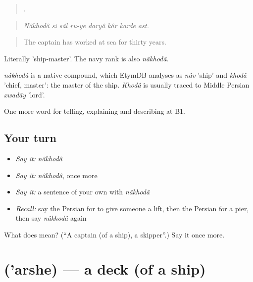 \begin{quote}
       .
\end{quote}

\begin{quote}
\emph{Nâkhodâ si sâl ru-ye daryâ kâr karde ast.}
\end{quote}

\begin{quote}
The captain has worked at sea for thirty years.
\end{quote}

Literally 'ship-master'. The navy rank is also \emph{nâkhodâ}.

\begin{cousinweb}
\emph{nâkhodâ} is a native compound, which EtymDB analyses as \emph{nâv} 'ship' and \emph{khodâ} 'chief, master': the master of the ship. \emph{Khodâ} is usually traced to Middle Persian \emph{xwadāy} 'lord'.
\end{cousinweb}

\begin{grammarlens}[title={What you've built}]
One more word for telling, explaining and describing at B1.
\end{grammarlens}

\subsection*{Your turn}
\begin{itemize}
\raggedright
  \item \emph{Say it:} \emph{nâkhodâ}
  \item \emph{Say it:} \emph{nâkhodâ}, once more
  \item \emph{Say it:} a sentence of your own with \emph{nâkhodâ}
  \item \emph{Recall:} say the Persian for to give someone a lift, then the Persian for a pier, then say \emph{nâkhodâ} again
\end{itemize}

\begin{tcolorbox}[breakable,colback=teal!4,colframe=teal!35!black,title={Before you move on}]
What does  mean? (\textquotedblleft{}A captain (of a ship), a skipper\textquotedblright{}.) Say it once more.
\end{tcolorbox}
\section[\texorpdfstring{\fa{عرشه} ('arshe)}{عرشه ('arshe)}]{ ('arshe) — a deck (of a ship)}

